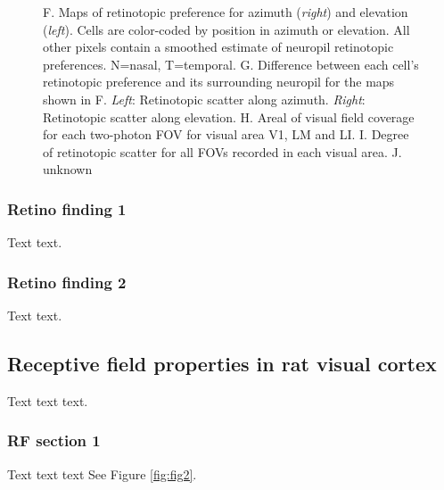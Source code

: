 \documentclass{article}
\begin{document}
\begin{figure}[ht]
  F.  Maps of retinotopic preference for azimuth (\textit{right}) and elevation (\textit{left}).  Cells are color-coded by position in azimuth or elevation.  All other pixels contain a smoothed estimate of neuropil retinotopic preferences. N=nasal, T=temporal.
  G.  Difference between each cell’s retinotopic preference and its surrounding neuropil for the maps shown in F. \textit{Left}:  Retinotopic scatter along azimuth. \textit{Right}:  Retinotopic scatter along elevation.
  H.  Areal of visual field coverage for each two-photon FOV for visual area V1, LM and LI. 
  I.  Degree of retinotopic scatter for all FOVs recorded in each visual area.
  J.  unknown
  \label{fig:fig1}
\end{figure}

\subsubsection{Retino finding 1}
Text text. 

\subsubsection{Retino finding 2}
Text text. 



\subsection{Receptive field properties in rat visual cortex}
Text text text.


\subsubsection{RF section 1}
Text text text
See Figure \ref{fig:fig2}.
\end{document}
